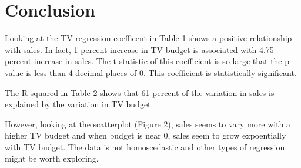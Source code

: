 \documentclass{article}\usepackage[]{graphicx}\usepackage[]{color}
\begin{document}
\pagebreak

\section{Conclusion}

Looking at the TV regression coefficent in Table 1 shows a positive relationship with sales. In fact, 1 percent increase in TV budget is associated with 4.75 percent increase in sales. The t statistic of this coefficient is so large that the p-value is less than 4 decimal places of 0. This coefficient is statistically significant.  

The R squared in Table 2 shows that 61 percent of the variation in sales is explained by the variation in TV budget.   

However, looking at the scatterplot (Figure 2), sales seems to vary more with a higher TV budget and when budget is near 0, sales seem to grow expoentially with TV budget. The data is not homoscedastic and other types of regression might be worth exploring.   
\end{document}
